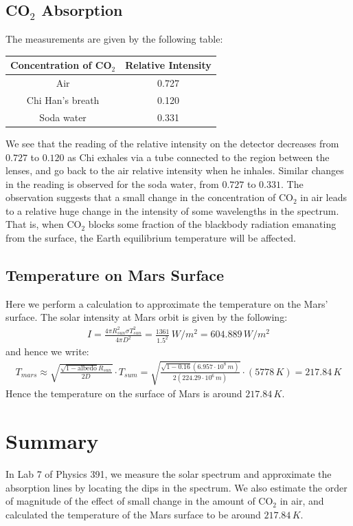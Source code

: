 \documentclass[11pt]{book}
\theoremstyle{break}
\theoremstyle{break}
\begin{document}
\subsection{CO$_2$ Absorption}
The measurements are given by the following table:
\begin{center}
\begin{tabular}{|c|c|}
\hline
\textbf{Concentration of CO$_2$} & \textbf{Relative Intensity}\\
\hline
Air & 0.727\\
\hline
Chi Han's breath & 0.120\\
\hline
Soda water & 0.331\\
\hline
\end{tabular}
\end{center}
We see that the reading of the relative intensity on the detector decreases from $0.727$ to $0.120$ as Chi exhales via a tube connected to the region between the lenses, and go back to the air relative intensity when he inhales. Similar changes in the reading is observed for the soda water, from $0.727$ to $0.331$. The observation suggests that a small change in the concentration of CO$_2$ in air leads to a relative huge change in the intensity of some wavelengths in the spectrum. That is, when CO$_2$ blocks some fraction of the blackbody radiation emanating from the surface, the Earth equilibrium temperature will be affected.\\


\subsection{Temperature on Mars Surface}
Here we perform a calculation to approximate the temperature on the Mars' surface. The solar intensity at Mars orbit is given by the following:
\begin{align*}
I = \frac{4\pi R_{sun}^2\sigma T_{sun}^2}{4\pi D^2} = \frac{1361}{1.5^2}\, W/m^2 = 604.889 \, W/m^2
\end{align*}
and hence we write:
\begin{align*}
T_{mars} \approx \sqrt{\frac{\sqrt{1-\text{albedo}}R_{sun}}{2D}}\cdot T_{sum} = \sqrt{\frac{\sqrt{1-\text{0.16}} (6.957\cdot 10^{8}\, m) }{2(224.29\cdot 10^{6}\, m)}}\cdot (5778\, K) = 217.84\,K
\end{align*}
Hence the temperature on the surface of Mars is around $217.84\, K$. \\

\section{Summary}
In Lab 7 of Physics 391, we measure the solar spectrum and approximate the absorption lines by locating the dips in the spectrum. We also estimate the order of magnitude of the effect of small change in the amount of CO$_2$ in air, and calculated the temperature of the Mars surface to be around $217.84\, K$. 
\end{document}
